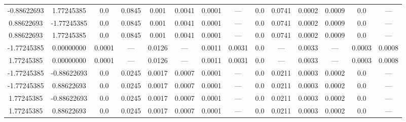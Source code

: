 \documentclass[a4paper,14pt]{extarticle}
\begin{document}
\begin{landscape}
\begin{table}[H]
\begin{tabular}{|c|c|*{6}{c}|*{6}{c}|}
-0.88622693        &  1.77245385        & 0.0    & 0.0845 & 0.001  & 0.0041 & 0.0001 & ---    & 0.0    & 0.0741 & 0.0002 & 0.0009 & 0.0    & ---    \\ 
 0.88622693        & -1.77245385        & 0.0    & 0.0845 & 0.001  & 0.0041 & 0.0001 & ---    & 0.0    & 0.0741 & 0.0002 & 0.0009 & 0.0    & ---    \\ 
 0.88622693        &  1.77245385        & 0.0    & 0.0845 & 0.001  & 0.0041 & 0.0001 & ---    & 0.0    & 0.0741 & 0.0002 & 0.0009 & 0.0    & ---    \\ 
-1.77245385        &  0.00000000        & 0.0001 & ---    & 0.0126 & ---    & 0.0011 & 0.0031 & 0.0    & ---    & 0.0033 & ---    & 0.0003 & 0.0008 \\ 
 1.77245385        &  0.00000000        & 0.0001 & ---    & 0.0126 & ---    & 0.0011 & 0.0031 & 0.0    & ---    & 0.0033 & ---    & 0.0003 & 0.0008 \\ 
-1.77245385        & -0.88622693        & 0.0    & 0.0245 & 0.0017 & 0.0007 & 0.0001 & ---    & 0.0    & 0.0211 & 0.0003 & 0.0002 & 0.0    & ---    \\ 
-1.77245385        &  0.88622693        & 0.0    & 0.0245 & 0.0017 & 0.0007 & 0.0001 & ---    & 0.0    & 0.0211 & 0.0003 & 0.0002 & 0.0    & ---    \\ 
 1.77245385        & -0.88622693        & 0.0    & 0.0245 & 0.0017 & 0.0007 & 0.0001 & ---    & 0.0    & 0.0211 & 0.0003 & 0.0002 & 0.0    & ---    \\          
 1.77245385        &  0.88622693        & 0.0    & 0.0245 & 0.0017 & 0.0007 & 0.0001 & ---    & 0.0    & 0.0211 & 0.0003 & 0.0002 & 0.0    & ---    \\          
\hline
\end{tabular}
\end{table} 


\end{landscape}
\end{document}
